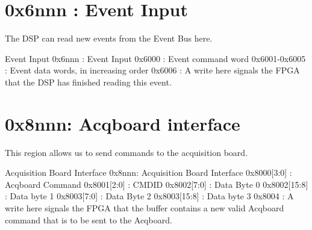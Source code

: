 \section{0x6nnn : Event Input}
The DSP can read new events from the Event Bus here. 
\begin{memmap}{Event Input}
0x6nnn : Event Input
0x6000 : Event command word
0x6001-0x6005 :  Event data words, in increasing order
0x6006 : A write here signals the FPGA that the DSP has finished reading this event.
\end{memmap}

\section{0x8nnn: Acqboard interface}
This region allows us to send commands to the acquisition board. 
\begin{memmap}{Acquisition Board Interface}
0x8nnn: Acquisition Board Interface
0x8000[3:0] : Acqboard Command 
0x8001[2:0] : CMDID 
0x8002[7:0] : Data Byte 0 
0x8002[15:8] : Data byte 1 
0x8003[7:0] : Data Byte 2 
0x8003[15:8] : Data byte 3 
0x8004 : A write here signals the FPGA that the buffer contains a new valid Acqboard command that is to be sent to the Acqboard.
\end{memmap}
